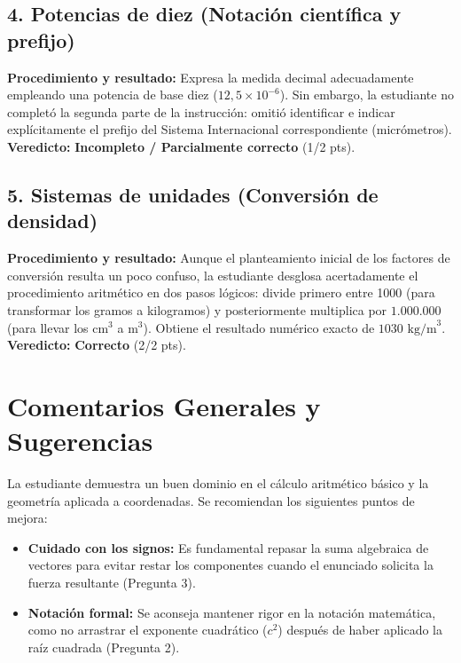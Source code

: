 \documentclass[12pt]{article}
\begin{document}
\subsection*{4. Potencias de diez (Notación científica y prefijo)}
\textbf{Procedimiento y resultado:} Expresa la medida decimal adecuadamente empleando una potencia de base diez ($12,5 \times 10^{-6}$). Sin embargo, la estudiante no completó la segunda parte de la instrucción: omitió identificar e indicar explícitamente el prefijo del Sistema Internacional correspondiente (micrómetros). \\
\textbf{Veredicto:} \textbf{Incompleto / Parcialmente correcto} (1/2 pts).

\subsection*{5. Sistemas de unidades (Conversión de densidad)}
\textbf{Procedimiento y resultado:} Aunque el planteamiento inicial de los factores de conversión resulta un poco confuso, la estudiante desglosa acertadamente el procedimiento aritmético en dos pasos lógicos: divide primero entre 1000 (para transformar los gramos a kilogramos) y posteriormente multiplica por $1.000.000$ (para llevar los $\text{cm}^3$ a $\text{m}^3$). Obtiene el resultado numérico exacto de $1030 \text{ kg/m}^3$. \\
\textbf{Veredicto:} \textbf{Correcto} (2/2 pts).

\vspace{0.5cm}
\section*{Comentarios Generales y Sugerencias}
La estudiante demuestra un buen dominio en el cálculo aritmético básico y la geometría aplicada a coordenadas. Se recomiendan los siguientes puntos de mejora:
\begin{itemize}
    \item \textbf{Cuidado con los signos:} Es fundamental repasar la suma algebraica de vectores para evitar restar los componentes cuando el enunciado solicita la fuerza resultante (Pregunta 3).
    \item \textbf{Notación formal:} Se aconseja mantener rigor en la notación matemática, como no arrastrar el exponente cuadrático ($c^2$) después de haber aplicado la raíz cuadrada (Pregunta 2).
\end{itemize}
\end{document}
